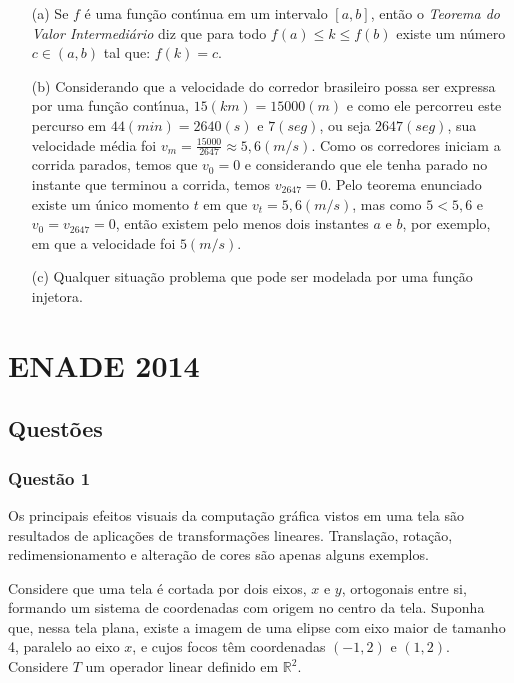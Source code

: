 \documentclass{report}
\begin{document}
\begin{enumerate}

\item[(a)] Se $f$ \'e uma fun\c c\~ao cont\'\i nua em um intervalo $[a,b]$, ent\~ao o {\it Teorema do Valor Intermedi\'ario} diz que para todo $f(a)\leq k \leq f(b)$ existe um n\'umero $c\in (a,b)$ tal que: $f(k)=c$. 

\item[(b)] Considerando que a velocidade do corredor brasileiro possa ser expressa por uma fun\c c\~ao cont\'\i nua, $15 (km)= 15000 (m)$ e como ele percorreu este percurso em $44 (min)= 2640 (s)$ e $7 (seg)$, ou seja $2647 (seg)$, sua velocidade m\'edia foi $\displaystyle v_m= \frac{15000}{2647}\approx 5,6 (m/s)$. Como os corredores iniciam a corrida parados, temos que $v_0=0$ e considerando que ele tenha parado no instante que terminou a corrida, temos $v_{2647}=0$. Pelo teorema enunciado existe um \'unico momento $t$ em que $v_t=5,6 (m/s)$, mas como $5<5,6$ e $v_0=v_{2647}=0$, ent\~ao existem pelo menos dois instantes $a$ e $b$, por exemplo, em que a velocidade foi $5 (m/s)$.

\item[(c)] Qualquer situa\c c\~ao problema que pode ser modelada por uma fun\c c\~ao injetora.

\end{enumerate}

\chapter{ENADE 2014}

\section{\color{blue} Quest\~oes}

\subsection{\color{blue} Quest\~ao 1}

Os principais efeitos visuais da computa\c c\~ao gr\'afica vistos em uma tela s\~ao resultados de aplica\c c\~oes de transforma\c c\~oes lineares. Transla\c c\~ao, rota\c c\~ao, redimensionamento e altera\c c\~ao de cores s\~ao apenas alguns exemplos.

Considere que uma tela \'e cortada por dois eixos, $x$ e $y$, ortogonais entre si, formando um sistema de coordenadas com origem no centro da tela. Suponha que, nessa tela plana, existe a imagem de uma elipse com eixo maior de tamanho 4, paralelo ao eixo $x$, e cujos focos t\^em coordenadas $(-1,2)$ e $(1,2)$. Considere $T$ um operador linear definido em $\mathbb R^2$.
\end{document}

